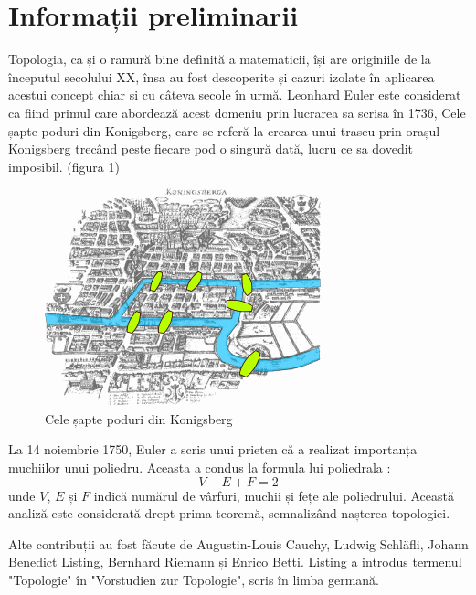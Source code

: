 \newpage
\section{Informații preliminarii}
Topologia, ca și o ramură bine definită a matematicii, își are originiile de la începutul secolului XX, 
însa au fost descoperite și cazuri izolate în aplicarea acestui concept chiar și cu câteva secole în urmă. 
Leonhard Euler este considerat ca fiind primul care abordează acest domeniu prin lucrarea sa scrisa în 1736, 
Cele șapte poduri din Konigsberg, care se referă la crearea unui traseu prin orașul Konigsberg trecând peste fiecare pod o 
singură dată, lucru ce sa dovedit imposibil. (figura 1) \newline

\begin{figure}[H]
    \begin{center}
        \includegraphics[scale=0.60]{imagini/istorie/bridge.png}        
    \end{center}    
        \caption{Cele șapte poduri din Konigsberg  \protect\footnotemark}
                    
    \label{fig:poduri}
\end{figure}


La 14 noiembrie 1750, Euler a scris unui prieten că a realizat importanța muchiilor unui poliedru. 
Aceasta a condus la formula lui poliedrala \cite{topolgy}: \[V-E+F=2\] unde \(V\), \(E\) și \(F\) indică numărul de vârfuri, 
muchii și fețe ale poliedrului. Această analiză este considerată drept prima teoremă, semnalizând nașterea 
topologiei.\newline

Alte contribuții au fost făcute de Augustin-Louis Cauchy, Ludwig Schläfli, Johann Benedict Listing, 
Bernhard Riemann și Enrico Betti. Listing a introdus termenul "Topologie" în "Vorstudien zur Topologie", 
scris în limba germană.\newline 
